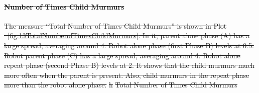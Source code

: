 \documentclass{ut-thesis}
\providecommand{\DIFdeltex}[1]{{\protect\color{red}\sout{#1}}}                      %
\providecommand{\DIFdelFL}[1]{\DIFdel{#1}} %
\providecommand{\DIFdel}[1]{\texorpdfstring{\DIFdeltex{#1}}{}} %
\begin{document}
\paragraph{\DIFdel{Number of Times Child Murmurs}}
\addtocounter{paragraph}{-1}%
\DIFdel{The measure ``Total Number of Times Child Murmurs'' is shown in Plot \ \ref{fig:13TotalNumberofTimesChildMurmurs}.  In it, parent alone phase (A) has a large spread, averaging around 4.  Robot alone phase (first Phase B) levels at 0.5.  Robot parent phase (C) has a large spread, averaging around 4.  Robot alone repeat phase (second Phase B) levels at 2.  It shows that the child murmurs much more often when the parent is present.  Also, child murmurs in the repeat phase more than the robot alone phase.
}%
\DIFdelFL{h}%
{%
\DIFdelFL{Total Number of Times Child Murmurs}}

\end{document}
